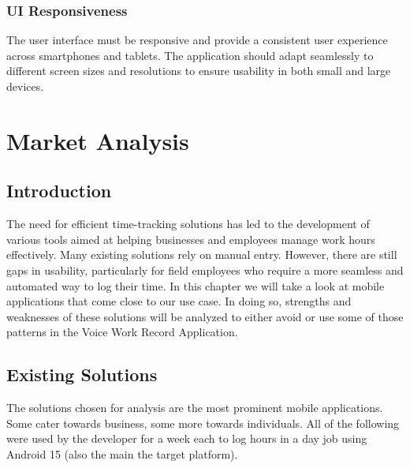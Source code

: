 \documentclass[
  digital,     %
  oneside,     %
  nosansbold,  %
  nocolorbold, %
  lof,         %
  lot,         %
]{fithesis4}
\begin{document}
\subsection{UI Responsiveness}  
The user interface must be responsive and provide a consistent user experience across smartphones and tablets. The application should adapt seamlessly to different screen sizes and resolutions to ensure usability in both small and large devices.

\chapter{Market Analysis}

\section{Introduction}
The need for efficient time-tracking solutions has led to the development of various tools aimed at helping businesses and employees manage work hours effectively. Many existing solutions rely on manual entry. However, there are still gaps in usability, particularly for field employees who require a more seamless and automated way to log their time. In this chapter we will take a look at mobile applications that come close to our use case. In doing so, strengths and weaknesses of these solutions will be analyzed to either avoid or use some of those patterns in the Voice Work Record Application.

\section{Existing Solutions}

The solutions chosen for analysis are the most prominent mobile applications. Some cater towards business, some more towards individuals. All of the following were used by the developer for a week each to log hours in a day job using Android 15 (also the main the target platform).
\end{document}
